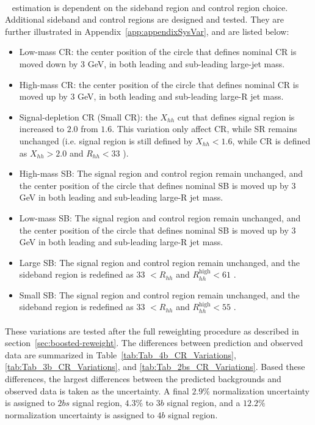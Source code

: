 \paragraph{}
\muqcd~ estimation is dependent on the sideband region and control region choice.
Additional sideband and control regions are designed and tested. 
They are further illustrated in Appendix~\ref{app:appendixSysVar}, and are listed below:
\begin{itemize}
	\item Low-mass CR: the center position of the circle that defines nominal CR is moved down by 3 GeV, in both leading and sub-leading large-jet mass.
	\item High-mass CR: the center position of the circle that defines nominal CR is moved up by 3 GeV, in both leading and sub-leading large-R jet mass.
	\item Signal-depletion CR (Small CR): the $X_{hh}$ cut that defines signal region is increased to $2.0$ from $1.6$. This variation only affect CR, while SR remains unchanged (i.e. signal region is still defined by $X_{hh}<1.6$, while CR is defined as $X_{hh}>2.0$ and $R_{hh}<33$ \GeV).
	\item High-mass SB: The signal region and control region remain unchanged, and the center position of the circle that defines nominal SB is moved up by 3 GeV in both leading and sub-leading large-R jet mass.
	\item Low-mass SB: The signal region and control region remain unchanged, and the center position of the circle that defines nominal SB is moved up by 3 GeV in both leading and sub-leading large-R jet mass.
	\item Large SB: The signal region and control region remain unchanged, and the sideband region is redefined as $33$ \GeV $< R_{hh}$ and $ R_{hh}^{\text{high}} < 61$ \GeV. 
	\item Small SB: The signal region and control region remain unchanged, and the sideband region is redefined as $33$ \GeV $< R_{hh}$ and $ R_{hh}^{\text{high}} < 55$ \GeV.
\end{itemize}

\paragraph{} 
These variations are tested after the full reweighting procedure as described in section~\ref{sec:boosted-reweight}.
The differences between prediction and observed data are summarized in Table~\ref{tab:Tab_4b_CR_Variations}, \ref{tab:Tab_3b_CR_Variations}, and \ref{tab:Tab_2bs_CR_Variations}.
Based these differences, the largest differences between the predicted backgrounds and observed data is taken as the uncertainty.
A final $2.9\%$ normalization uncertainty is assigned to $2bs$ signal region, $4.3\%$ to $3b$ signal region, and a $12.2\%$ normalization uncertainty is assigned to $4b$ signal region.

